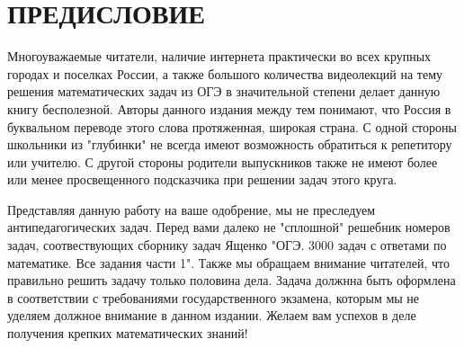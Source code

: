 \chapter*{ПРЕДИСЛОВИЕ}

Многоуважаемые читатели, наличие интернета практически во всех крупных городах и поселках России, а также большого количества видеолекций на тему решения математических задач из ОГЭ в значительной степени
делает данную книгу бесполезной. Авторы данного издания между тем понимают, что Россия в буквальном переводе этого слова протяженная, широкая страна. С одной стороны школьники из "глубинки" не всегда имеют возможность обратиться к репетитору или учителю. С другой стороны родители выпускников также не имеют более или менее просвещенного подсказчика при решении задач этого круга.

Представляя данную работу на ваше одобрение, мы не преследуем антипедагогических задач.
Перед вами далеко не "сплошной" решебник номеров задач, соотвествующих сборнику задач Ященко "ОГЭ. 3000 задач с ответами по математике. Все задания части 1".
Также мы обращаем внимание читателей, что правильно решить задачу только половина дела. Задача должнна быть оформлена в соответствии с требованиями государственного экзамена,
которым мы не уделяем должное внимание в данном издании. Желаем вам успехов в деле получения крепких математических знаний!